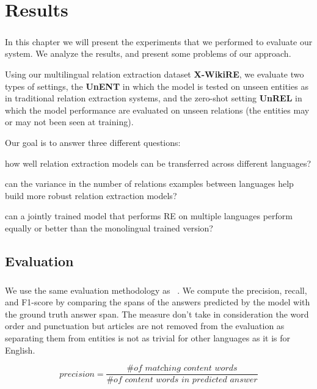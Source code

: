 \chapter{Results}
\label{chpt:6}
\paragraph{}
In this chapter we will present the experiments that we performed to evaluate our system. We analyze the results, and present some problems of our approach.


Using our multilingual relation extraction dataset \textbf{X-WikiRE}, we evaluate two types of settings, the \textbf{UnENT} in which the model is tested on unseen entities as in traditional relation extraction systems, and the zero-shot setting \textbf{UnREL} in which the model performance are evaluated on unseen relations (the entities may or may not been seen at training).

Our goal is to answer three different questions: \begin{enumerate*}[a) , font=\bfseries]
    \item how well relation extraction models can be transferred across different languages?
    \item can the variance in the number of relations examples between languages help  build more robust relation extraction models?
    \item can a jointly trained model that performs RE on multiple languages perform equally or better than the monolingual trained version?
\end{enumerate*}


\section{Evaluation}
\paragraph{}
We use the same evaluation methodology as ~\cite{levy2017zero}. We compute the precision, recall, and F1-score by comparing the spans of the answers predicted by the model with the ground truth answer span. The measure don't take in consideration the word order and punctuation but articles are not removed from the evaluation as separating them from entities is not as trivial for other languages as it is for English.

\begin{equation}
    precision = \frac{\textit{\# of matching content words}}{\textit{\# of content words in predicted answer}}
\label{eq:precision}
\end{equation}


